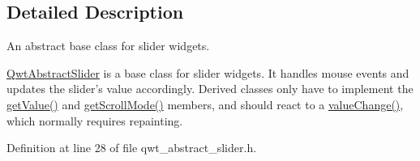 \subsection{Detailed Description}
An abstract base class for slider widgets. 

\hyperlink{class_qwt_abstract_slider}{Qwt\-Abstract\-Slider} is a base class for slider widgets. It handles mouse events and updates the slider's value accordingly. Derived classes only have to implement the \hyperlink{class_qwt_abstract_slider_a6e26a993536813c2d9846a28f3c27aa7}{get\-Value()} and \hyperlink{class_qwt_abstract_slider_a4124aa3b1e462d57ea2693214e66da0b}{get\-Scroll\-Mode()} members, and should react to a \hyperlink{class_qwt_abstract_slider_a2f04dc51e4402b51fef3250bcc99dc7f}{value\-Change()}, which normally requires repainting. 

Definition at line 28 of file qwt\-\_\-abstract\-\_\-slider.\-h.




